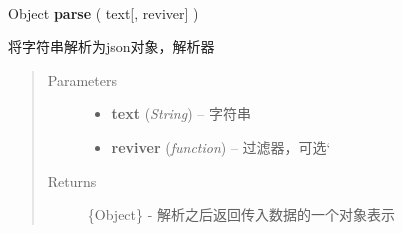 \documentclass[letterpaper,10pt,english]{sphinxmanual}
\begin{document}
\begin{fulllineitems}
\label{api/core/json/index:json.parse}~
\begin{DUlineblock}{0em}
\item[] Object \textbf{parse} ( text{[}, reviver{]} )
\item[] 将字符串解析为json对象，解析器
\end{DUlineblock}
\begin{quote}\begin{description}
\item[{Parameters}] \leavevmode\begin{itemize}
\item {}
\textbf{text} (\emph{String}) -- 字符串

\item {}
\textbf{reviver} (\emph{function}) -- 过滤器，可选{}`

\end{itemize}

\item[{Returns}] \leavevmode
\{Object\} - 解析之后返回传入数据的一个对象表示

\end{description}\end{quote}

\end{fulllineitems}


\end{document}
